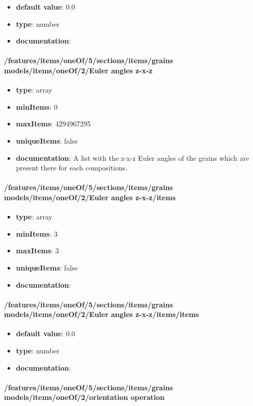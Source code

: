 \begin{itemize}\item {\bf default value}: 0.0
\item {\bf type}: number
\item {\bf documentation}: 
\end{itemize}\paragraph{/features/items/oneOf/5/sections/items/grains models/items/oneOf/2/Euler angles z-x-z}
\begin{itemize}\item {\bf type}: array
\item {\bf minItems}: 0
\item {\bf maxItems}: 4294967295
\item {\bf uniqueItems}: false
\item {\bf documentation}: A list with the z-x-z Euler angles of the grains which are present there for each compositions.
\end{itemize}\paragraph{/features/items/oneOf/5/sections/items/grains models/items/oneOf/2/Euler angles z-x-z/items}
\begin{itemize}\item {\bf type}: array
\item {\bf minItems}: 3
\item {\bf maxItems}: 3
\item {\bf uniqueItems}: false
\item {\bf documentation}: 
\end{itemize}\paragraph{/features/items/oneOf/5/sections/items/grains models/items/oneOf/2/Euler angles z-x-z/items/items}
\begin{itemize}\item {\bf default value}: 0.0
\item {\bf type}: number
\item {\bf documentation}: 
\end{itemize}\paragraph{/features/items/oneOf/5/sections/items/grains models/items/oneOf/2/orientation operation}
